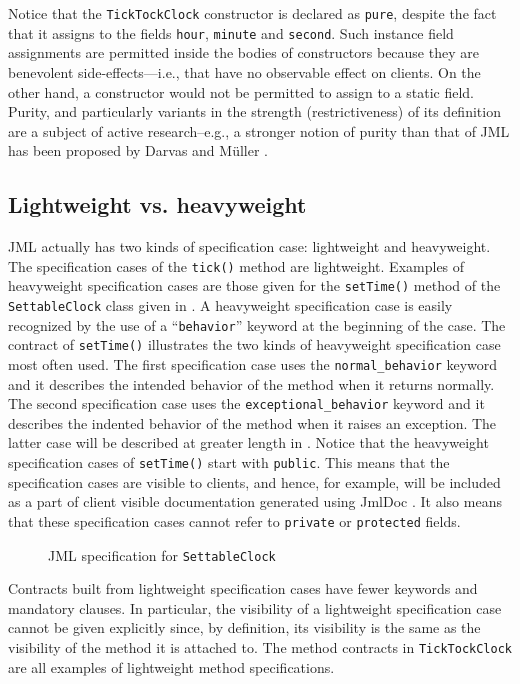 \documentclass{llncs}
\begin{document}
Notice that the \texttt{TickTockClock} constructor is declared as \texttt{pure}, 
despite the fact 
that it assigns to the fields \texttt{hour}, \texttt{minute} and \texttt{second}.
Such instance field assignments are permitted inside the bodies of constructors
because they are benevolent side-effects---i.e., that have no observable effect
on clients.
%
On the other hand, a constructor would not be permitted to assign to a static
field.
%
Purity, and particularly variants in the strength (restrictiveness) of its
definition are a subject of active research--e.g., a stronger notion of purity
than that of JML has been proposed by Darvas and M\"uller
\cite{DarvasMuller05}.

\subsection{Lightweight vs. heavyweight}

JML actually has two kinds of specification case: lightweight and heavyweight.
%
The specification cases of the \texttt{tick()} method are lightweight.
%
%
Examples of heavyweight specification cases are those given for the
\texttt{setTime()} method of the \texttt{SettableClock} class given in
.
%
A heavyweight specification case is easily recognized by the use of a
``\texttt{behavior}'' keyword at the beginning of the case.
%
The contract of \texttt{setTime()} illustrates the two kinds of heavyweight
specification case most often used.
%
The first specification case uses the \texttt{normal\_behavior} keyword and it
describes the intended behavior of the method when it returns normally.
%
%
The second specification case uses the \texttt{exceptional\_behavior} keyword and it
describes the indented behavior of the method when it raises an exception.
%
The latter case will be described at greater length in .
Notice that the heavyweight specification cases of \texttt{setTime()} start
with \texttt{public}.
%
%
This means that the specification cases are visible to clients, and hence, for
example, will be included as a part of client visible documentation generated
using JmlDoc \cite{STTT05}. It also means that these specification cases cannot
refer to \texttt{private} or \texttt{protected} fields.

\begin{figure}[tbp]
%
%
\vspace*{-2ex} %
\caption{\label{Example:SettableClock}JML specification for \texttt{SettableClock}}
\end{figure}
%
%
Contracts built from lightweight specification cases have fewer keywords and
mandatory clauses.  In particular, the visibility of a lightweight
specification case cannot be given explicitly since, by definition, its
visibility is the same as 
the visibility of the method it is attached to.
%
The method contracts in \texttt{TickTockClock} are all examples of 
lightweight method specifications.
\end{document}
